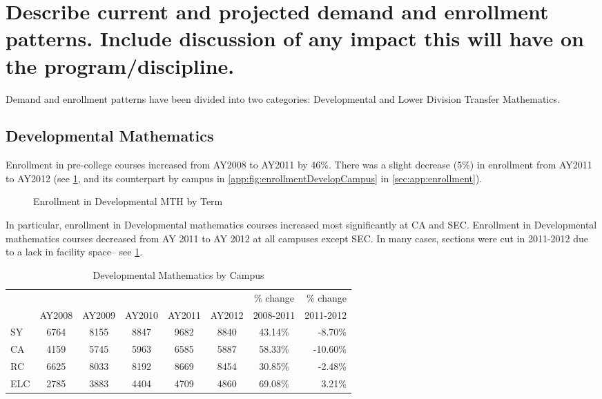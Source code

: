   \section{Describe current and projected demand and enrollment patterns.  Include discussion of any impact this will have on the program/discipline.
  }
  Demand and enrollment patterns have been divided into two categories: Developmental and Lower Division Transfer Mathematics.

  \subsection{Developmental Mathematics}
  Enrollment in pre-college courses increased from AY2008 to AY2011 by 46\%. There was a slight decrease (5\%) in enrollment from AY2011 to AY2012 (see \cref{needs:fig:enrollmentDevelopTerm}, and its counterpart by campus in \vref{app:fig:enrollmentDevelopCampus} in \cref{sec:app:enrollment}).

\begin{figure}[!htb]
	\centering
	
	\caption{Enrollment in Developmental MTH by Term}
    \label{needs:fig:enrollmentDevelopTerm}
\end{figure}

In particular, enrollment in Developmental mathematics courses increased most significantly at CA and SEC. Enrollment in Developmental mathematics courses decreased from AY 2011 to AY 2012 at all campuses except SEC. In many cases, sections were cut in 2011-2012 due to a lack in facility space-- see \cref{needs:tab:enrollmentDevelp}. 


\begin{table}[!htb]
\caption{Developmental Mathematics by Campus}
\label{needs:tab:enrollmentDevelp}
	\begin{tabular}{l*{6}{c}r}
\toprule
    &   &   &   &   &   &   \% change & \% change \\
	& AY2008&	AY2009&	AY2010&	AY2011&	AY2012&	2008-2011&	2011-2012\\
    \midrule
SY	& 6764	&    8155 &  8847 &  9682 &  8840 &  43.14\% &   -8.70\% \\
CA	& 4159	&    5745 &  5963 &  6585 &  5887 &  58.33\% &   -10.60\%\\
RC	& 6625	&    8033 &  8192 &  8669 &  8454 &  30.85\% &   -2.48\% \\
ELC	& 2785	&    3883 &  4404 &  4709 &  4860 &  69.08\% &   3.21\%  \\
\bottomrule
\end{tabular}
\end{table}

